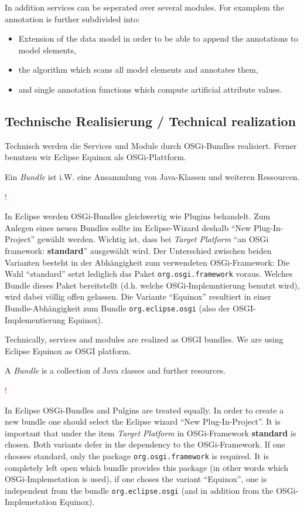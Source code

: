 \documentclass[10pt,a4paper]{scrartcl}
\newcommand{\hinweis}[1]{
\begin{framed}
\begin{minipage}[t]{0.02\textwidth}
\textcolor{red}{\Huge{\sffamily !}}
\end{minipage}
\begin{minipage}[t]{0.94\textwidth}
#1
\end{minipage}
\end{framed}
}
\providecommand{\deng}[2]{#1 / {\sffamily #2}}
\providecommand{\deutsch}[1]{#1}
\providecommand{\englisch}[1]{{\sffamily #1}}
\begin{document}
\englisch{In addition services can be seperated over several modules.
For examplem the annotation is further subdivided into:
\begin{itemize}
 \item Extension of the data model in order to be able to append the annotations to model elements,
 \item the algorithm which scans all model elements and annotates them,
 \item and single annotation functions which compute artificial attribute values.
\end{itemize}}


\subsection{\deng{Technische Realisierung}{Technical realization}}
\deutsch{Technisch werden die Services und Module durch OSGi-Bundles realisiert. Ferner
benutzen wir Eclipse Equinox als OSGi-Plattform.

Ein \emph{Bundle} ist i.W. eine Ansammlung von Java-Klassen und weiteren Ressourcen.

\hinweis{In Eclipse werden OSGi-Bundles gleichwertig wie Plugins behandelt. Zum
Anlegen eines neuen Bundles sollte im Eclipse-Wizard deshalb ``New
Plug-In-Project'' gewählt werden. Wichtig ist, dass bei \emph{Target Platform}
``an OSGi framework: \textbf{standard}'' ausgewählt wird. Der Unterschied
zwischen beiden Varianten besteht in der Abhängigkeit zum verwendeten
OSGi-Framework: Die Wahl ``standard'' setzt lediglich das Paket
\texttt{org.osgi.framework} voraus. Welches Bundle dieses Paket bereitstellt
(d.h. welche OSGi-Implemntierung benutzt wird), wird dabei völlig offen
gelassen. Die Variante ``Equinox'' resultiert in einer Bundle-Abhängigkeit zum
Bundle \texttt{org.eclipse.osgi} (also der OSGI-Implementierung Equinox).}
}

\englisch{
Technically, services and modules are realized as OSGI bundles. We are using
Eclipse Equinox as OSGI platform. 

A \emph{Bundle} is a collection of Java classes and further resources.

\hinweis{In Eclipse OSGi-Bundles and Pulgins are treated equally. In order to
create a new bundle one should select the Eclipse wizard ``New
Plug-In-Project''. It is important that under the item \emph{Target Platform} in
OSGi-Framework \textbf{standard} is chosen. Both variants defer in the
dependency to the OSGi-Framework. If one chooses standard, only the package
\texttt{org.osgi.framework} is required. It is completely left open which bundle
provides this package (in other words which OSGi-Implemetation is used), if one
choses the variant ``Equinox'', one is independent from the bundle
\texttt{org.eclipse.osgi} (and in addition from the OSGi-Implemetation Equinox).
}}
\end{document}
